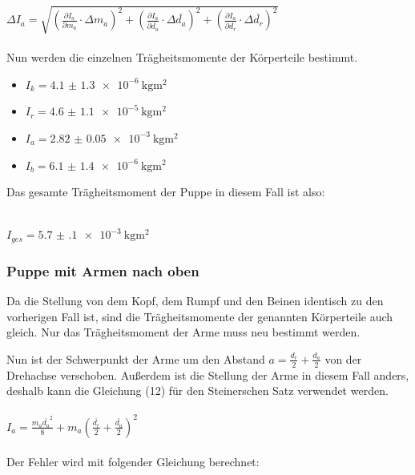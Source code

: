 $\Delta I_a = \sqrt{\left(\frac{\partial I_a}{\partial m_a} \cdot \Delta m_a \right)^2
  + \left(\frac{\partial I_a}{\partial \bar{d_a}} \cdot \Delta \bar{d_a} \right)^2
  + \left(\frac{\partial I_a}{\partial \bar{d_r}} \cdot \Delta \bar{d_r} \right)^2}$\\\\

Nun werden die einzelnen Trägheitsmomente der Körperteile bestimmt.

\begin{itemize}
  \item $I_k = \SI{4.1(13)e-6}{\kilo\gram\meter\squared}$
  \item $I_r = \SI{4.6(11)e-5}{\kilo\gram\meter\squared}$
  \item $I_a = \SI{2.82(5)e-3}{\kilo\gram\meter\squared}$
  \item $I_b = \SI{6.1(14)e-6}{\kilo\gram\meter\squared}$
\end{itemize}

Das gesamte Trägheitsmoment der Puppe in diesem Fall ist also:\\\\

\centerline{$I_{ges} = \SI{5.7(1)e-3}{\kilo\gram\meter\squared}$}

\subsubsection{Puppe mit Armen nach oben}

Da die Stellung von dem Kopf, dem Rumpf und den Beinen identisch zu den vorherigen
Fall ist, sind die Trägheitsmomente der genannten Körperteile auch gleich.
Nur das Trägheitsmoment der Arme muss neu bestimmt werden.

Nun ist der Schwerpunkt der Arme um den Abstand $a = \frac{d_r}{2} + \frac{d_a}{2}$
von der Drehachse verschoben. Außerdem ist die Stellung der Arme in diesem Fall anders,
deshalb kann die Gleichung (12) für den Steinerschen Satz verwendet werden.\\\\

$I_a = \frac{m_a \bar{d_a}^2}{8} + m_a \left( \frac{\bar{d_r}}{2} + \frac{\bar{d_a}}{2} \right)^2$\\\\

Der Fehler wird mit folgender Gleichung berechnet:\\\\


